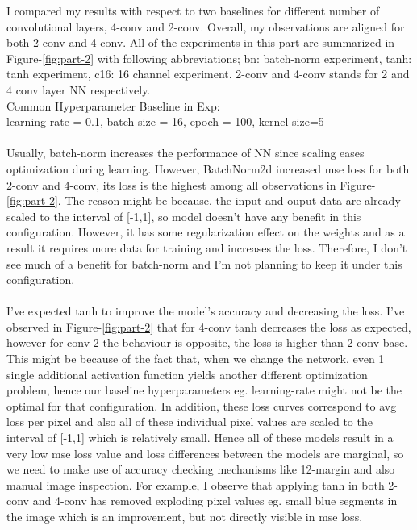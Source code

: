 \documentclass[12pt]{article}
\begin{document}
    \begin{center}
        \raggedright
        I compared my results with respect to two baselines for different number of convolutional layers, 4-conv and 2-conv.
        Overall, my observations are aligned for both 2-conv and 4-conv. All of the experiments in this part are summarized in Figure-\ref*{fig:part-2} with following abbreviations; bn: batch-norm experiment, tanh: tanh experiment, c16: 16 channel experiment. 2-conv and 4-conv stands for 2 and 4 conv layer NN respectively.
        \\
        Common Hyperparameter Baseline in Exp: \\
        learning-rate = 0.1, batch-size = 16, epoch = 100, kernel-size=5
        \\~\\
        Usually, batch-norm increases the performance of NN since scaling eases optimization during learning.
        However, BatchNorm2d increased mse loss for both 2-conv and 4-conv, its loss is the highest among all observations in Figure-\ref*{fig:part-2}.
        The reason might be because, the input and ouput data are already scaled to the interval of [-1,1], so model doesn't have any benefit in this configuration.
        However, it has some regularization effect on the weights and as a result it requires more data for training and increases the loss.
        Therefore, I don't see much of a benefit for batch-norm and I'm not planning to keep it under this configuration.
        \\~\\
        I've expected tanh to improve the model's accuracy and decreasing the loss. I've observed in Figure-\ref*{fig:part-2} that
        for 4-conv tanh decreases the loss as expected, however for conv-2 the behaviour is opposite, the loss is higher than 2-conv-base.
        This might be because of the fact that, when we change the network, even 1 single additional activation function yields another different optimization problem,
        hence our baseline hyperparameters eg. learning-rate might not be the optimal for that configuration.
        In addition, these loss curves correspond to avg loss per pixel and also all of these individual pixel values are scaled to the interval of [-1,1]  which is relatively small. Hence all of these models result in a very low mse loss value
        and loss differences between the models are marginal, so we need to make use of accuracy checking mechanisms like 12-margin and also manual image inspection.
        For example, I observe that applying tanh in both 2-conv and 4-conv has removed exploding pixel values eg. small blue segments in the image which is an improvement, but not directly visible in mse loss.

\end{center}
\end{document}
